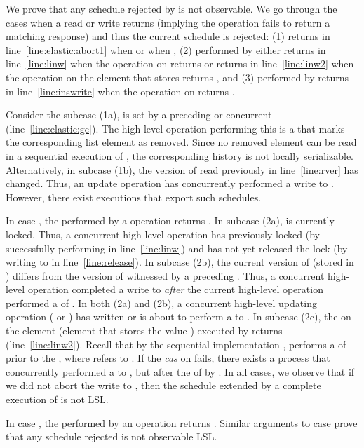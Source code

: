 \documentclass[11pt,pdftex,letterpaper]{article}
\begin{document}
\begin{proofsketch}
We prove that any schedule rejected by  is  
not observable.
We go through the cases when a read or write returns  (implying the operation fails to return a matching response) and
thus the current schedule is rejected:
(1)  returns  in line~\ref{line:elastic:abort1}
when  or when , (2)
 performed by  either returns 
in line~\ref{line:linw} when the  operation on
 returns  or returns 
in line~\ref{line:linw2} when the  operation on the element that
stores  returns , and (3)  performed by  returns 
in line~\ref{line:inswrite} when the  operation on
 returns .

Consider the subcase (1a),  is set  by a
preceding or concurrent  (line~\ref{line:elastic:gc}).
The high-level operation performing this  is a  
that marks the corresponding list element as removed. 
Since no removed element can be read in a sequential execution
of , the corresponding history is not locally serializable.
Alternatively, in subcase (1b), the version of  read previously in line~\ref{line:rver}
has changed. Thus, an update operation has concurrently performed a write to .
However, there exist executions that export such schedules.

In case , the  performed by a  operation returns .
In subcase (2a),  is currently
locked. 
Thus, a concurrent high-level operation has previously locked  (by successfully
performing  in line~\ref{line:linw}) and has not yet released
the lock (by writing  to
 in line~\ref{line:release}). 
In subcase (2b), the current version of  (stored in ) differs 
from the version of  witnessed by a preceding . 
Thus, a concurrent high-level operation completed a write to 
\emph{after} the current high-level operation  performed a  of .
In both (2a) and (2b), a concurrent high-level updating operation 
( or ) has written or is about to perform a  to .  
In subcase (2c), the  on the element  (element that stores the value ) executed by  
returns  (line~\ref{line:linw2}).
Recall that by the sequential implementation , 
 performs a  of
 prior to the , where 
refers to .
If the \emph{cas} on  fails, there exists a process 
that concurrently performed a  to , but
after the  of  by .
In all cases, we observe that if we did not abort the write to , then
the schedule extended by a complete execution of  is not LSL.

In case , the  performed by an  operation returns . Similar arguments to
case  prove that any schedule rejected is not observable LSL.
\end{proofsketch}
\end{document}
